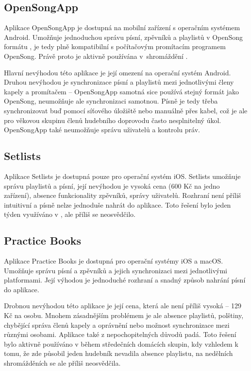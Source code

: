 \subsection{OpenSongApp}

Aplikace OpenSongApp je dostupná na mobilní zařízení s operačním systémem Android. Umož\-ňuje jednoduchou správu písní, zpěvníků a playlistů v OpenSong formátu \cite{open-song-format}, je tedy plně kompatibilní s počítačovým promítacím programem OpenSong. Právě proto je aktivně používána v~shromáždění .

Hlavní nevýhodou této aplikace je její omezení na operační systém Android. Druhou nevýho\-dou je synchronizace písní a playlistů mezi jednotlivými členy kapely a promítačem -- OpenSongApp samotná sice používá stejný formát jako OpenSong, neumožňuje ale synchronizaci samotnou. Písně je tedy třeba synchronizovat buď pomocí síťového úložiště nebo manuálně přes kabel, což je ale pro věkovou skupinu členů hudebního doprovodu často nesplnitelný úkol. OpenSongApp také neumožňuje správu uživatelů a kontrolu práv.

\subsection{Setlists}

Aplikace Setlists je dostupná pouze pro operační systém iOS. Setlists umožňuje správu playlistů a písní, její nevýhodou je vysoká cena (600 Kč na jedno zařízení), absence funkcionality zpěvníků, správy uživatelů. Rozhraní není příliš intuitivní a písně nelze jednoduše nahrát do aplikace. Toto řešení bylo jeden týden využíváno v , ale příliš se neosvědčilo.

\subsection{Practice Books}

Aplikace Practice Books je dostupná pro operační systémy iOS a macOS. Umožňuje správu písní a zpěvníků a jejich synchronizaci mezi jednotlivými platformami. Její výhodou je jednoduché rozhraní a snadný způsob nahrání písní do aplikace.

Drobnou nevýhodou této aplikace je její cena, která ale není příliš vysoká -- 129 Kč na osobu. Mnohem zásadnějším problémem je ale absence playlistů, polštiny, chybějící správa členů kapely a oprávnění nebo možnost synchronizace mezi různými osobami. Aplikace také z nepochopitelných důvodů padá. Toto řešení bylo aktivně používáno v  během středečních domácích skupin, kdy vzhledem k tomu, že zde působil jeden hudebník nevadila absence playlistu, na nedělních shromážděních se ale příliš neosvědčila.

